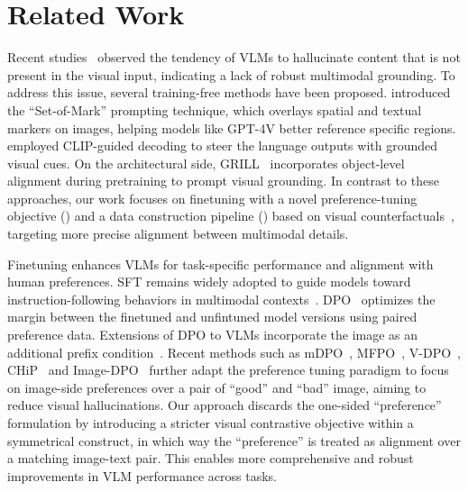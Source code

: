\section{Related Work}
\label{sec:related}
Recent studies~\citep{dai2024instructblip,deng2024seeing,mmvp,chen2024quantifying,symdpo} observed the tendency of VLMs to hallucinate content that is not present in the visual input, indicating a lack of robust multimodal grounding. 
To address this issue, several training-free methods have been proposed. \citet{yang2023set} introduced the ``Set-of-Mark'' prompting technique, which overlays spatial and textual markers on images, helping models like GPT-4V better reference specific regions. \citet{deng2024seeing} employed CLIP-guided decoding to steer the language outputs with grounded visual cues. 
On the architectural side, GRILL~\cite{jin2023grill} incorporates object-level alignment during pretraining to prompt visual grounding.
In contrast to these approaches, our work focuses on finetuning with a novel preference-tuning objective () and a data construction pipeline () based on visual counterfactuals~\citep{countercurate, finecopsref}, targeting more precise alignment between multimodal details.

Finetuning enhances VLMs for task-specific performance and alignment with human preferences. 
SFT remains widely adopted to guide models toward instruction-following behaviors in multimodal contexts~\citep{sun2024layoutvlm,jiang2024supervised}. 
DPO~\citep{dpo} optimizes the margin between the finetuned and unfintuned model versions using paired preference data. Extensions of DPO to VLMs incorporate the image as an additional prefix condition~\citep{povid}. 
Recent methods such as mDPO~\citep{mdpo}, MFPO~\citep{mfpo}, V-DPO~\citep{vdpo}, CHiP~\citep{chip} and Image-DPO~\citep{imagedpo} further adapt the preference tuning paradigm to focus on image-side preferences over a pair of ``good'' and ``bad'' image, aiming to reduce visual hallucinations.
Our approach \modelname discards the one-sided ``preference'' formulation by introducing a stricter visual contrastive objective within a symmetrical construct, in which way the ``preference'' is treated as alignment over a matching image-text pair. This enables more comprehensive and robust improvements in VLM performance across tasks.